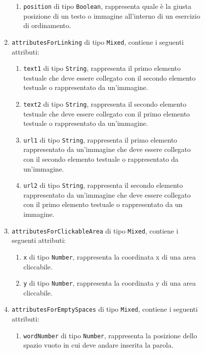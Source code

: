 \begin{itemize}
\begin{itemize}
\begin{itemize}
\begin{itemize}
\begin{enumerate}
\begin{enumerate}
        						\item \texttt{position} di tipo \texttt{Boolean}, rappresenta quale è la giusta posizione di un testo o immagine all'interno di un esercizio di ordinamento.
						\end{enumerate}  
							\item \texttt{attributesForLinking} di tipo \texttt{Mixed}, contiene i seguenti attributi:
        					\begin{enumerate}
        						\item \texttt{text1} di tipo \texttt{String}, rappresenta il primo elemento testuale che deve essere collegato con il secondo elemento testuale o rappresentato da un'immagine.
        						\item \texttt{text2} di tipo \texttt{String}, rappresenta il secondo elemento testuale che deve essere collegato con il primo elemento testuale o rappresentato da un'immagine.
        						\item \texttt{url1} di tipo \texttt{String}, rappresenta il primo elemento rappresentato da un'immagine che deve essere collegato con il secondo elemento testuale o rappresentato da un'immagine.
        						\item \texttt{url2} di tipo \texttt{String}, rappresenta il secondo elemento rappresentato da un'immagine che deve essere collegato con il primo elemento testuale o rappresentato da un immagine.
						\end{enumerate}  
							\item \texttt{attributesForClickableArea} di tipo \texttt{Mixed}, contiene i seguenti attributi:
        					\begin{enumerate}
        						\item \texttt{x} di tipo \texttt{Number}, rappresenta la coordinata x di una area cliccabile.  
        						\item \texttt{y} di tipo \texttt{Number}, rappresenta la coordinata y di una area cliccabile.  
						\end{enumerate}    
							\item \texttt{attributesForEmptySpaces} di tipo \texttt{Mixed}, contiene i seguenti attributi:
        					\begin{enumerate}
        						\item \texttt{wordNumber} di tipo \texttt{Number}, rappresenta la posizione dello spazio vuoto in cui deve andare inserita la parola.  
						\end{enumerate}        						  						
					\end{enumerate}

\end{itemize}
\end{itemize}
\end{itemize}
\end{itemize}
